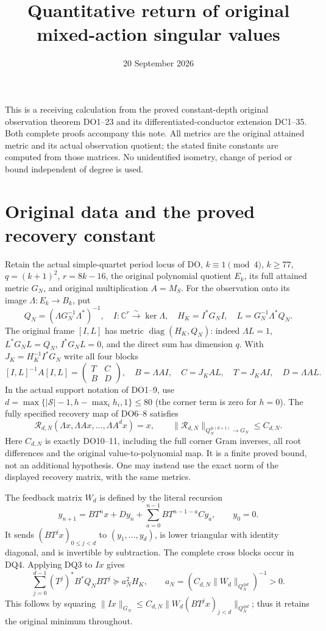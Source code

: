 \documentclass[11pt]{article}
\title{Quantitative return of original mixed-action singular values}
\author{}
\date{20 September 2026}
\DeclareMathOperator{\diag}{diag}
\begin{document}
\maketitle
This is a receiving calculation from the proved constant-depth original
observation theorem DO1--23 and its differentiated-conductor extension
DC1--35. Both complete proofs accompany this note. All metrics are the
original attained metric and its actual observation quotient; the stated
finite constants are computed from those matrices. No unidentified
isometry, change of period or bound independent of degree is used.

\section{Original data and the proved recovery constant}
Retain the actual simple-quartet period locus of DO, $k\equiv1\pmod4$,
$k\ge77$, $q=(k+1)^2$, $r=8k-16$, the original polynomial quotient
$E_k$, its full attained metric $G_N$, and original multiplication $A=M_S$.
For the observation onto its image $\Lambda:E_k\to B_k$, put
\[
 Q_N=(\Lambda G_N^{-1}\Lambda^*)^{-1},\quad
 I:\mathbb C^r\overset\sim\longrightarrow\ker\Lambda,
 \quad H_K=I^*G_NI,\quad L=G_N^{-1}\Lambda^*Q_N.
 \tag{DQ1}
\]
The original frame $[I,L]$ has metric $\diag(H_K,Q_N)$: indeed
$\Lambda L=1$, $L^*G_NL=Q_N$, $I^*G_NL=0$, and the direct sum
has dimension $q$. With $J_K=H_K^{-1}I^*G_N$ write all four blocks
\[
 [I,L]^{-1}A[I,L]=\begin{pmatrix}T&C\\B&D\end{pmatrix},\quad
 B=\Lambda AI,\quad C=J_KAL,\quad T=J_KAI,\quad D=\Lambda AL.
 \tag{DQ2}
\]
In the actual support notation of DO1--9, use
$d=\max\{|\mathcal S|-1,h-\max_i h_i,1\}\le80$ (the corner term
is zero for $h=0$). The fully specified recovery map of DO6--8 satisfies
\[
 \mathcal R_{d,N}(\Lambda x,\Lambda Ax,\ldots,\Lambda A^dx)=x,
 \qquad \|\mathcal R_{d,N}\|_{Q_N^{\oplus(d+1)}\to G_N}
       \le C_{d,N}.\tag{DQ3}
\]
Here $C_{d,N}$ is exactly DO10--11, including the full corner Gram
inverses, all root differences and the original value-to-polynomial map.
It is a finite proved bound, not an additional hypothesis. One may instead
use the exact norm of the displayed recovery matrix, with the same metrics.

The feedback matrix $W_d$ is defined by the literal recursion
\[
 y_{n+1}=BT^nx+Dy_n+\sum_{a=0}^{n-1}BT^{n-1-a}Cy_a,
 \qquad y_0=0.\tag{DQ4}
\]
It sends $(BT^jx)_{0\le j<d}$ to $(y_1,\ldots,y_d)$, is lower
triangular with identity diagonal, and is invertible by subtraction.
The complete cross blocks occur in DQ4. Applying DQ3 to $Ix$ gives
\[
 \sum_{j=0}^{d-1}(T^j)^*B^*Q_NBT^j
 \succeq a_N^2H_K,
 \qquad a_N=(C_{d,N}\|W_d\|_{Q_N^{\oplus d}})^{-1}>0.
 \tag{DQ5}
\]
This follows by squaring
$\|Ix\|_{G_N}\le C_{d,N}\|W_d(BT^jx)_{j<d}\|_{Q_N^{\oplus d}}$;
thus it retains the original minimum throughout.
\end{document}
